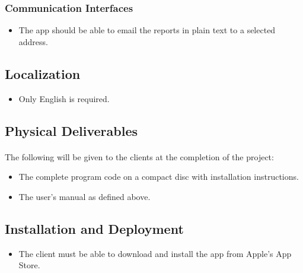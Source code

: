 \subsubsection{Communication Interfaces}
\begin{itemize}
\item The app should be able to email the reports in plain text to a selected address.
\end{itemize}
\subsection{Localization}
\begin{itemize}
\item Only English is required.
\end{itemize}
\subsection{Physical Deliverables}
\paragraph{}The following will be given to the clients at the completion of the project:
\begin{itemize}
\item The complete program code on a compact disc with installation instructions.
\item The user's manual as defined above.
\end{itemize}
\subsection{Installation and Deployment}
\begin{itemize}
\item The client must be able to download and install the app from Apple's App Store.
\end{itemize}
